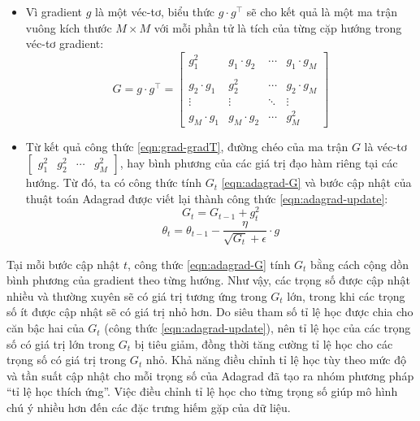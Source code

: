 \begin{itemize}
	\item Vì gradient $g$ là một véc-tơ, biểu thức $g \cdot g^{\top}$ sẽ cho kết quả là một ma trận vuông kích thước $M \times M$ với mỗi phần tử là tích của từng cặp hướng trong véc-tơ gradient:
	\begin{equation} \label{eqn:grad-gradT}
		G = g \cdot g^{\top} = \begin{bmatrix}
			g^{2}_1 & g_1 \cdot g_2 & \dotsb & g_1 \cdot g_M \\ \\
			g_2 \cdot g_1 & g^{2}_2 & \dotsb & g_2 \cdot g_M \\
			\vdots & \vdots & \ddots & \vdots \\
			g_M \cdot g_1 & g_M \cdot g_2 & \dotsb & g^{2}_M
		\end{bmatrix}
	\end{equation}

	\item Từ kết quả công thức \ref{eqn:grad-gradT}, đường chéo của ma trận $G$ là véc-tơ $\begin{bmatrix} g^{2}_{1} & g^{2}_{2} & \cdots & g^{2}_{M} \end{bmatrix}$, hay bình phương của các giá trị đạo hàm riêng tại các hướng. Từ đó, ta có công thức tính $G_t$ \ref{eqn:adagrad-G} và bước cập nhật của thuật toán Adagrad được viết lại thành công thức \ref{eqn:adagrad-update}:
	\begin{equation} \label{eqn:adagrad-G}
		G_{t} = G_{t-1} + g^{2}_{t}
	\end{equation}
	\begin{equation} \label{eqn:adagrad-update}
		\theta_t = \theta_{t-1} - \frac{\eta}{\sqrt{G_t} + \epsilon} \cdot g
	\end{equation}
\end{itemize}

Tại mỗi bước cập nhật $t$, công thức \ref{eqn:adagrad-G} tính $G_t$ bằng cách cộng dồn bình phương của gradient theo từng hướng. Như vậy, các trọng số được cập nhật nhiều và thường xuyên sẽ có giá trị tương ứng trong $G_t$ lớn, trong khi các trọng số ít được cập nhật sẽ có giá trị nhỏ hơn. Do siêu tham số tỉ lệ học được chia cho căn bậc hai của $G_t$ (công thức \ref{eqn:adagrad-update}), nên tỉ lệ học của các trọng số có giá trị lớn trong $G_t$ bị tiêu giảm, đồng thời tăng cường tỉ lệ học cho các trọng số có giá trị trong $G_t$ nhỏ. Khả năng điều chỉnh tỉ lệ học tùy theo mức độ và tần suất cập nhật cho mỗi trọng số của Adagrad đã tạo ra nhóm phương pháp ``tỉ lệ học thích ứng''. Việc điều chỉnh tỉ lệ học cho từng trọng số giúp mô hình chú ý nhiều hơn đến các đặc trưng hiếm gặp của dữ liệu.

